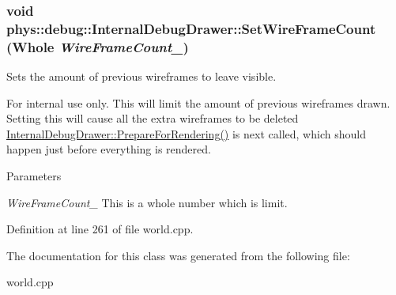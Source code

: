 \hypertarget{classphys_1_1debug_1_1InternalDebugDrawer_a76922fda7bb3b59d301e50d67e4f3c72}{
\subsubsection[{SetWireFrameCount}]{\setlength{\rightskip}{0pt plus 5cm}void phys::debug::InternalDebugDrawer::SetWireFrameCount ({\bf Whole} {\em WireFrameCount\_\-})}}
\label{db/d27/classphys_1_1debug_1_1InternalDebugDrawer_a76922fda7bb3b59d301e50d67e4f3c72}


Sets the amount of previous wireframes to leave visible. 

\begin{DoxyInternal}{For internal use only.}
This will limit the amount of previous wireframes drawn. Setting this will cause all the extra wireframes to be deleted \hyperlink{classphys_1_1debug_1_1InternalDebugDrawer_a1002293d223ca20e5bccc3c3412ce262}{InternalDebugDrawer::PrepareForRendering()} is next called, which should happen just before everything is rendered. 
\begin{DoxyParams}{Parameters}
\item[{\em WireFrameCount\_\-}]This is a whole number which is limit. \end{DoxyParams}
\end{DoxyInternal}


Definition at line 261 of file world.cpp.



The documentation for this class was generated from the following file:\begin{DoxyCompactItemize}
\item 
world.cpp\end{DoxyCompactItemize}
